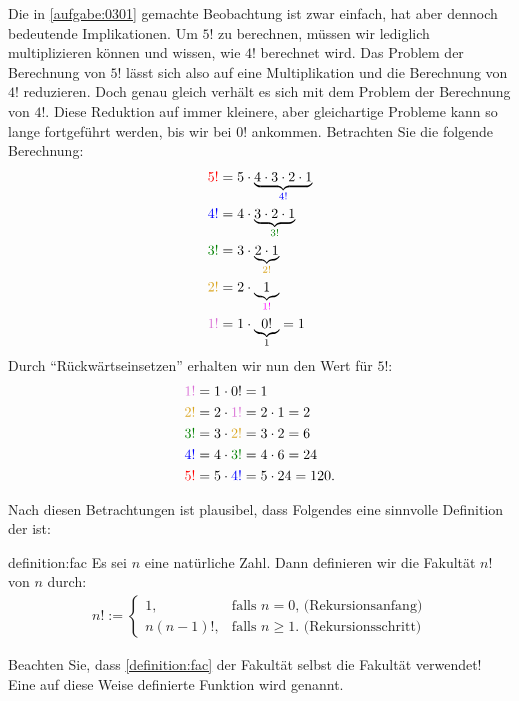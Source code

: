 \noindent
Die in \cref{aufgabe:0301} gemachte Beobachtung ist zwar einfach, hat aber dennoch bedeutende Implikationen. Um $5!$ zu berechnen, müssen wir lediglich multiplizieren können und wissen, wie $4!$ berechnet wird. Das Problem der Berechnung von $5!$ lässt sich also auf eine Multiplikation und die Berechnung von $4!$ reduzieren. Doch genau gleich verhält es sich mit dem Problem der Berechnung von $4!$. Diese Reduktion auf immer kleinere, aber gleichartige Probleme kann so lange fortgeführt werden, bis wir bei $0!$ ankommen. Betrachten Sie die folgende Berechnung:
\begin{align*}
    \textcolor{Red}{5!} &= 5\cdot\underbrace{4\cdot 3\cdot 2\cdot 1}_{\textcolor{Blue}{4!}} \\
    \textcolor{Blue}{4!} &= 4\cdot\underbrace{3\cdot 2\cdot 1}_{\textcolor{Green}{3!}} \\
    \textcolor{Green}{3!} &= 3\cdot\underbrace{2\cdot 1}_{\textcolor{Goldenrod}{2!}} \\
    \textcolor{Goldenrod}{2!} &= 2\cdot\underbrace{1}_{\textcolor{Fuchsia}{1!}} \\
    \textcolor{Orchid}{1!} &= 1\cdot\underbrace{0!}_{1} = 1
\end{align*}
Durch \enquote{Rückwärtseinsetzen} erhalten wir nun den Wert für $5!$:
\begin{align*}
    \textcolor{Orchid}{1!} &= 1\cdot 0! = 1 \\
    \textcolor{Goldenrod}{2!} &= 2\cdot\textcolor{Orchid}{1!} = 2\cdot 1 = 2 \\
    \textcolor{Green}{3!} &= 3\cdot \textcolor{Goldenrod}{2!} = 3\cdot 2 = 6 \\
    \textcolor{Blue}{4!} &= 4\cdot\textcolor{Green}{3!} = 4\cdot 6 = 24 \\
    \textcolor{Red}{5!} &= 5\cdot\textcolor{Blue}{4!} = 5\cdot 24 = 120.
\end{align*}

\noindent
Nach diesen Betrachtungen ist plausibel, dass Folgendes eine sinnvolle Definition der  ist:
\begin{definition}[Fakultät]{definition:fac}
Es sei $n$ eine natürliche Zahl. Dann definieren wir die Fakultät $n!$ von $n$ durch:
\begin{align}\label{eq:fakultaet}
n! := 
  \begin{cases}
    1, &\text{falls $n=0$, (Rekursionsanfang)} \\
    n(n-1)!, & \text{falls  $n\geq 1$. (Rekursionsschritt)}
  \end{cases}
\end{align}
\end{definition}
\noindent
Beachten Sie, dass \cref{definition:fac} der Fakultät selbst die Fakultät verwendet! Eine auf diese Weise definierte Funktion wird  genannt.

